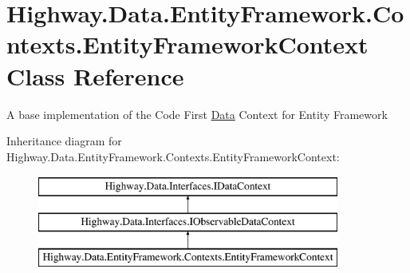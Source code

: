 \hypertarget{class_highway_1_1_data_1_1_entity_framework_1_1_contexts_1_1_entity_framework_context}{\section{Highway.\-Data.\-Entity\-Framework.\-Contexts.\-Entity\-Framework\-Context Class Reference}
\label{class_highway_1_1_data_1_1_entity_framework_1_1_contexts_1_1_entity_framework_context}
}


A base implementation of the Code First \hyperlink{namespace_highway_1_1_data}{Data} Context for Entity Framework  


Inheritance diagram for Highway.\-Data.\-Entity\-Framework.\-Contexts.\-Entity\-Framework\-Context\-:\begin{figure}[H]
\begin{center}
\leavevmode
\includegraphics[height=3.000000cm]{class_highway_1_1_data_1_1_entity_framework_1_1_contexts_1_1_entity_framework_context}
\end{center}
\end{figure}
